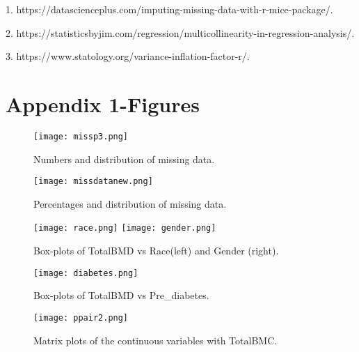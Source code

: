 \documentclass[11pt]{article}
\begin{document}
\smallskip

1. https://datascienceplus.com/imputing-missing-data-with-r-mice-package/.

\smallskip

2. https://statisticsbyjim.com/regression/multicollinearity-in-regression-analysis/.

\smallskip

3. https://www.statology.org/variance-inflation-factor-r/.

\smallskip

\section * {Appendix 1-Figures}	
        
            \begin{figure}[!htbp]
            \centering
            \texttt{[image: missp3.png]}
            \caption{Numbers and distribution of missing data.}
            \label{fig:method}
            \end{figure}
            
            \begin{figure}[!htbp]
            \centering
            \texttt{[image: missdatanew.png]}
            \caption{Percentages and distribution of missing data.}
            \label{fig:method}
            \end{figure}
  
             \begin{figure}[!htbp]
            \texttt{[image: race.png]}
            \texttt{[image: gender.png]}
            \caption{Box-plots of TotalBMD vs Race(left) and Gender (right).}
            \label{fig:method}
            \end{figure}

            \begin{figure}[!htbp]
            \centering
            \texttt{[image: diabetes.png]}
            \caption{Box-plots of TotalBMD vs Pre\_diabetes.}
            \label{fig:method}
            \end{figure}

            \begin{figure}[!htbp]
            \centering
            \texttt{[image: ppair2.png]}
            \caption{Matrix plots of the continuous variables with TotalBMC.}
            \label{fig:method}
            \end{figure}
\end{document}
